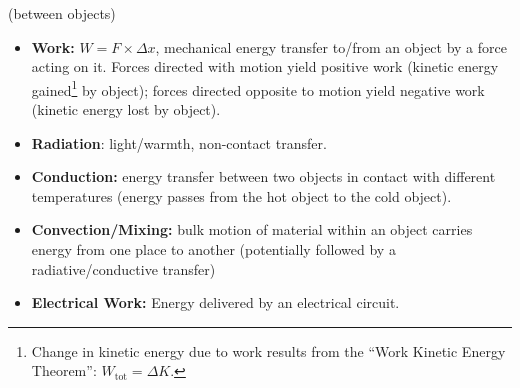\documentclass[12pt]{article}
\begin{document}
 (between objects)
	\begin{itemize}
	\item {\bf Work:} $W = F \times \Delta x$, mechanical energy transfer to/from an object by a force acting on it. Forces directed with motion yield positive work (kinetic energy gained\footnote{Change in kinetic energy due to work results from the ``Work Kinetic Energy Theorem'':  $W_\text{tot} = \Delta K$.} by object); forces directed opposite to motion yield negative work (kinetic energy lost by object).
	\item {\bf Radiation}:  light/warmth, non-contact transfer.
	\item {\bf Conduction:} energy transfer between two objects in contact with different temperatures (energy passes from the hot object to the cold object).
	\item {\bf Convection/Mixing:} bulk motion of material within an object carries energy from one place to another (potentially followed by a radiative/conductive transfer)
	\item {\bf Electrical Work:} Energy delivered by an electrical circuit.
	\end{itemize}

\newpage
\end{document}
